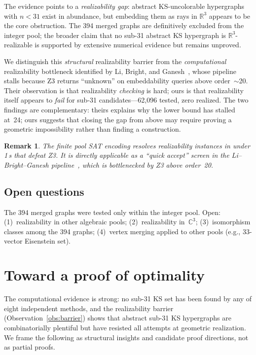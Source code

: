 \documentclass[twocolumn,pra,superscriptaddress,nofootinbib]{revtex4-2}
\newtheorem{remark}{Remark}
\newcommand{\R}{\mathbb{R}}
\newcommand{\C}{\mathbb{C}}
\begin{document}
The evidence points to a \emph{realizability gap}: abstract KS-uncolorable hypergraphs with $n < 31$ exist in abundance, but embedding them as rays in $\R^3$ appears to be the core obstruction. The 394 merged graphs are definitively excluded from the integer pool; the broader claim that no sub-31 abstract KS hypergraph is $\R^3$-realizable is supported by extensive numerical evidence but remains unproved.

We distinguish this \emph{structural} realizability barrier from the \emph{computational} realizability bottleneck identified by Li, Bright, and Ganesh~\cite{LiBrightGanesh2024}, whose pipeline stalls because Z3 returns ``unknown'' on embeddability queries above order~$\sim$20. Their observation is that realizability \emph{checking} is hard; ours is that realizability itself appears to \emph{fail} for sub-31 candidates---62,096 tested, zero realized. The two findings are complementary: theirs explains why the lower bound has stalled at~24; ours suggests that closing the gap from above may require proving a geometric impossibility rather than finding a construction.

\begin{remark}
The finite pool SAT encoding resolves realizability instances in under 1\,s that defeat Z3. It is directly applicable as a ``quick accept'' screen in the Li--Bright--Ganesh pipeline~\cite{LiBrightGanesh2024}, which is bottlenecked by Z3 above order~20.
\end{remark}

\subsection{Open questions}

The 394 merged graphs were tested only within the integer pool. Open: (1)~realizability in other algebraic pools; (2)~realizability in~$\C^3$; (3)~isomorphism classes among the 394 graphs; (4)~vertex merging applied to other pools (e.g., 33-vector Eisenstein set).

\section{Toward a proof of optimality}
\label{sec:proof}

The computational evidence is strong: no sub-31 KS set has been found by any of eight independent methods, and the realizability barrier (Observation~\ref{obs:barrier}) shows that abstract sub-31 KS hypergraphs are combinatorially plentiful but have resisted all attempts at geometric realization. We frame the following as structural insights and candidate proof directions, not as partial proofs.
\end{document}
